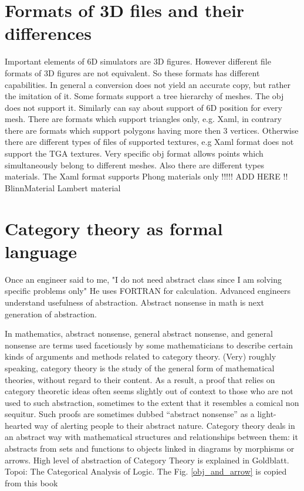 \documentclass[10pt,journal,compsoc]{IEEEtran}
\begin{document}
	\section{Formats of 3D files and their differences}
Important elements of 6D simulators are 3D figures. However different  file formats of 3D figures are not equivalent.  So  these formats has different capabilities. In general a conversion does not yield an accurate copy, but rather the imitation of it. Some formats support a tree hierarchy  of meshes. The obj does not support it. Similarly can say about support of 6D position for every mesh. There are formats which support triangles only, e.g. Xaml, in contrary there are formats which support polygons having more then 3 vertices. Otherwise there are different types of files of supported textures, e.g Xaml format does not support the TGA textures. Very specific obj format allows points which simultaneously belong to different meshes. Also there are different types materials. The Xaml format supports Phong materials only  !!!!! ADD HERE !! BlinnMaterial Lambert material
	
	\section{Category theory as formal language}
	
	Once an engineer said to me, "I do not need abstract class since I am solving specific problems only" He uses FORTRAN for calculation. Advanced engineers understand usefulness of abstraction. Abstract nonsense in math is next generation of abstraction.
	
	In mathematics, abstract nonsense, general abstract nonsense, and general nonsense are terms used facetiously by some mathematicians to describe certain kinds of arguments and methods related to category theory. (Very) roughly speaking, category theory is the study of the general form of mathematical theories, without regard to their content. As a result, a proof that relies on category theoretic ideas often seems slightly out of context to those who are not used to such abstraction, sometimes to the extent that it resembles a comical non sequitur. Such proofs are sometimes dubbed “abstract nonsense” as a light-hearted way of alerting people to their abstract nature. Category theory deals in an abstract way with mathematical structures and relationships between them: it abstracts from sets and functions to objects linked in diagrams by morphisms or arrows. High level of abstraction of Category Theory is explained in Goldblatt. Topoi: The Categorical Analysis of Logic. The Fig. \ref{obj_and_arrow} is copied from this book
	
\end{document}
